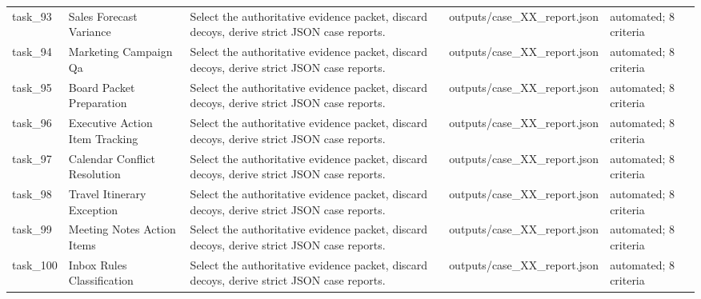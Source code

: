 \documentclass[11pt]{article}
\begin{document}
\begin{longtable}{L{0.07\textwidth}L{0.20\textwidth}L{0.33\textwidth}L{0.28\textwidth}L{0.08\textwidth}}
task\_93 & Sales Forecast Variance & Select the authoritative evidence packet, discard decoys, derive strict JSON case reports. & outputs/case\_XX\_report.json & automated; 8 criteria \\
task\_94 & Marketing Campaign Qa & Select the authoritative evidence packet, discard decoys, derive strict JSON case reports. & outputs/case\_XX\_report.json & automated; 8 criteria \\
task\_95 & Board Packet Preparation & Select the authoritative evidence packet, discard decoys, derive strict JSON case reports. & outputs/case\_XX\_report.json & automated; 8 criteria \\
task\_96 & Executive Action Item Tracking & Select the authoritative evidence packet, discard decoys, derive strict JSON case reports. & outputs/case\_XX\_report.json & automated; 8 criteria \\
task\_97 & Calendar Conflict Resolution & Select the authoritative evidence packet, discard decoys, derive strict JSON case reports. & outputs/case\_XX\_report.json & automated; 8 criteria \\
task\_98 & Travel Itinerary Exception & Select the authoritative evidence packet, discard decoys, derive strict JSON case reports. & outputs/case\_XX\_report.json & automated; 8 criteria \\
task\_99 & Meeting Notes Action Items & Select the authoritative evidence packet, discard decoys, derive strict JSON case reports. & outputs/case\_XX\_report.json & automated; 8 criteria \\
task\_100 & Inbox Rules Classification & Select the authoritative evidence packet, discard decoys, derive strict JSON case reports. & outputs/case\_XX\_report.json & automated; 8 criteria \\
\bottomrule
\end{longtable}
\endgroup
\end{document}
